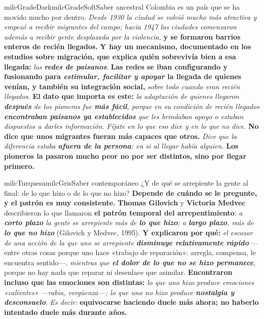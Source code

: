 \documentclass[11pt,letterpaper]{article}
\begin{document}
\begin{softbox}{milcGradeDark}{milcGradeSoft}{Saber ancestral}
Colombia es un país que se ha movido mucho por dentro. \emph{Desde 1930 la ciudad se volvió mucho más atractiva y empezó a recibir migrantes del campo; hacia 1947 las ciudades comenzaron además a recibir gente desplazada por la violencia,} \textbf{y se formaron barrios enteros de recién llegados.} \textbf{Y hay un mecanismo, documentado en los estudios sobre migración, que explica quién sobrevivía bien a esa llegada:} \emph{las \textbf{redes de paisanos}}. \textbf{Las redes se iban configurando y fusionando para \emph{estimular, facilitar y apoyar} la llegada de quienes venían, y también su integración social,} \emph{sobre todo cuando eran recién llegados.} \textbf{El dato que importa es este:} \emph{la adaptación de quienes llegaron \textbf{después} de los pioneros fue \textbf{más fácil}, porque en su condición de recién llegados \textbf{encontraban paisanos ya establecidos} que les brindaban apoyo o estaban dispuestos a darles información.} \emph{Fíjate en lo que eso dice y en lo que no dice.} \textbf{No dice que unos migrantes fueran más capaces que otros.} \emph{Dice que la diferencia estaba \textbf{afuera de la persona}: en si al llegar había alguien.} \textbf{Los pioneros la pasaron mucho peor no por ser distintos, sino por llegar primero.}
\end{softbox}

\begin{softbox}{milcTurquesa}{milcGris}{Saber contemporáneo}
¿Y de qué se arrepiente la gente al final: de lo que hizo o de lo que no hizo? \textbf{Depende de cuándo se le pregunte, y el patrón es muy consistente.} \textbf{Thomas Gilovich} y \textbf{Victoria Medvec} describieron lo que llamaron \textbf{el patrón temporal del arrepentimiento}: \emph{a \textbf{corto plazo} la gente se arrepiente más de \textbf{lo que hizo}; a \textbf{largo plazo}, más de \textbf{lo que no hizo}} (Gilovich y Medvec, 1995). \textbf{Y explicaron por qué:} \emph{el escozor de una acción de la que uno se arrepiente \textbf{disminuye relativamente rápido}} ---entre otras cosas porque uno hace «trabajo de reparación»: arregla, compensa, le encuentra sentido---, \emph{mientras que \textbf{el dolor de lo que no se hizo permanece}}, porque no hay nada que reparar ni desenlace que asimilar. \textbf{Encontraron incluso que las emociones son distintas:} \emph{lo que uno hizo produce emociones «calientes» ---rabia, vergüenza---; lo que uno no hizo produce \textbf{nostalgia y desconsuelo}}. \emph{Es decir:} \textbf{equivocarse haciendo duele más ahora; no haberlo intentado duele más durante años.}
\end{softbox}
\end{document}
